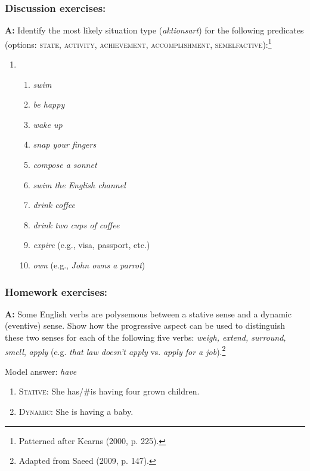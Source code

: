 \subsubsection{Discussion exercises:}\label{sec:}

\textbf{A:} Identify the most likely situation type (\textit{aktionsart}) for the following predicates (options: \textsc{state, activity, achievement, accomplishment, semelfactive}):\footnote{Patterned after Kearns (2000, p. 225).}

\begin{enumerate}
\item \begin{enumerate}
\item \itshape
swim
\item \itshape
be happy
\item \itshape
wake up
\item \itshape
snap your fingers
\item \itshape
compose a sonnet
\item \itshape
swim the English channel
\item \itshape
drink coffee
\item \itshape
drink two cups of coffee
\item \textit{expire} (e.g., visa, passport, etc.)
\item \textit{own} (e.g., \textit{John owns a parrot})
\end{enumerate}
\end{enumerate}
\subsubsection{Homework exercises:}\label{sec:}

\textbf{A:} Some English verbs are polysemous between a stative sense and a dynamic (eventive) sense. Show how the progressive aspect can be used to distinguish these two senses for each of the following five verbs: \textit{weigh, extend, surround, smell}, \textit{apply} (e.g. \textit{that law doesn’t apply} vs. \textit{apply for a job}).\footnote{Adapted from Saeed (2009, p. 147).}

\textsf{Model answer:} \textsf{\textit{have}}

\begin{enumerate}
\item \textsf{\textsc{Stative}}\textsf{: She has/\#is having four grown children.}
\item \textsf{\textsc{Dynamic}}\textsf{: She is having a baby.}
\end{enumerate}

